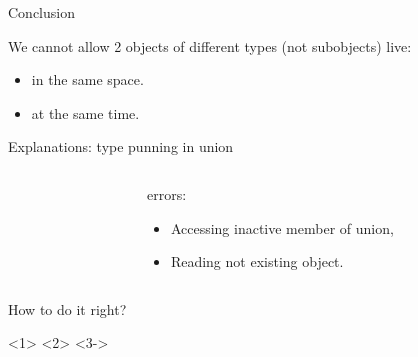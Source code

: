 \documentclass{panicsoftware-presentation}
\makeatletter
\newenvironment{itemizeSeq}{\begin{itemize}[<+-|alert@+>]}{\end{itemize}}
\makeatother
\begin{document}
\begin{frame}{Conclusion}

We cannot allow 2 objects of different types (not subobjects) live:

\begin{itemize}
	\item in the same space.
	\item at the same time.
\end{itemize}

\end{frame}

\begin{frame}{Explanations: type punning in union}

\begin{columns}

\begin{column}{0.48\linewidth}
\inputminted[highlightlines={14}]{\myCpp}{examples/invalid_union_use.cpp}
\end{column}
\begin{column}{0.48\linewidth}

\centerline{\alert{errors:}}

\begin{itemizeSeq}
\item Accessing inactive member of union,
\item Reading not existing object.
\end{itemizeSeq}

\end{column}

\end{columns}


\end{frame}

\begin{frame}{How to do it right?}

<1>
<2>
<3->

\end{frame}
\end{document}
